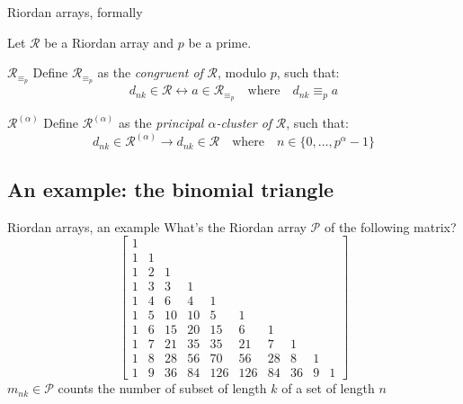 \documentclass[10pt,serif, professionalfont]{beamer}
\begin{document}
\begin{frame}{Riordan arrays, formally}

    Let $\mathcal{R}$ be a Riordan array and $p$ be a prime.
    
    \begin{block}{$\mathcal{R}_{\equiv_{p}}$}
        Define $\mathcal{R}_{\equiv_{p}}$
        as the \emph{congruent of} $\mathcal{R}$, modulo $p$, such that:
        \begin{displaymath}
            d_{nk}\in\mathcal{R} \leftrightarrow a \in\mathcal{R}_{\equiv_{p}}
            \quad \text{where} \quad d_{nk}\equiv_{p} a
        \end{displaymath}
    \end{block}

    \begin{block}{$\mathcal{R}^{(\alpha)}$}
        Define $\mathcal{R}^{(\alpha)}$
        as the \emph{principal $\alpha$-cluster of} $\mathcal{R}$, such that:
        \begin{displaymath}
            d_{nk}\in\mathcal{R}^{(\alpha)}\rightarrow d_{nk}\in\mathcal{R}
            \quad \text{where}\quad n\in\lbrace0,\ldots,p^{\alpha}-1\rbrace
        \end{displaymath}
    \end{block}
    

\end{frame}

\subsection{An example: the binomial triangle}

\begin{frame}{Riordan arrays, an example}
    What's the Riordan array $\mathcal{P}$ of the following matrix?
    \begin{displaymath} 
        \left[
        \begin{array}{rrrrrrrrrr}
        1 &  &  &  &  &  &  &  &  &  \\
        1 & 1 &  &  &  &  &  &  &  &  \\
        1 & 2 & 1 &  &  &  &  &  &  &  \\
        1 & 3 & 3 & 1 &  &  &  &  &  &  \\
        1 & 4 & 6 & 4 & 1 &  &  &  &  &  \\
        1 & 5 & 10 & 10 & 5 & 1 &  &  &  &  \\
        1 & 6 & 15 & 20 & 15 & 6 & 1 &  &  &  \\
        1 & 7 & 21 & 35 & 35 & 21 & 7 & 1 &  &  \\
        1 & 8 & 28 & 56 & 70 & 56 & 28 & 8 & 1 &  \\
        1 & 9 & 36 & 84 & 126 & 126 & 84 & 36 & 9 & 1
        \end{array}
        \right] 
    \end{displaymath}
    $m_{nk}\in\mathcal{P}$ counts the number of subset of length $k$ of a set of length $n$
\end{frame}
\end{document}
